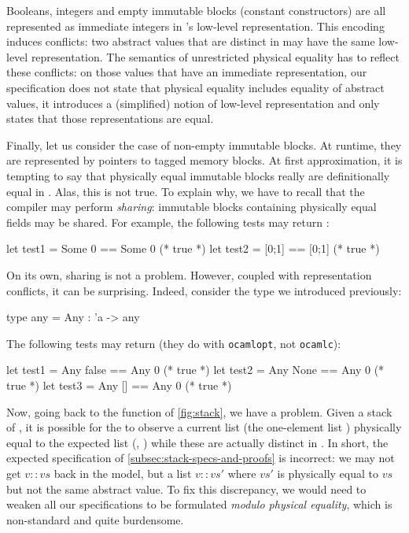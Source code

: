 Booleans, integers and empty immutable blocks (constant constructors) are all represented as immediate integers in \OCaml's low-level representation. This encoding induces conflicts: two abstract values that are distinct in \Rocq may have the same low-level representation.
The semantics of unrestricted physical equality has to reflect these conflicts: on those values that have an immediate representation, our specification does not state that physical equality includes equality of abstract values, it introduces a (simplified) notion of low-level representation and only states that those representations are equal.

Finally, let us consider the case of non-empty immutable blocks.
At runtime, they are represented by pointers to tagged memory blocks.
At first approximation, it is tempting to say that physically equal immutable blocks really are definitionally equal in \Rocq.
Alas, this is not true.
To explain why, we have to recall that the \OCaml compiler may perform \emph{sharing}: immutable blocks containing physically equal fields may be shared.
For example, the following tests may return :

\begin{ocamlcode}
let test1 = Some 0 == Some 0 (* true *)
let test2 = [0;1]  == [0;1]  (* true *)
\end{ocamlcode}

On its own, sharing is not a problem.
However, coupled with representation conflicts, it can be surprising.
Indeed, consider the  type we introduced previously:

\begin{ocamlcode}
type any = Any : 'a -> any
\end{ocamlcode}

The following tests may return  (they do with \texttt{ocamlopt}, not \texttt{ocamlc}):

\begin{ocamlcode}
let test1 = Any false == Any 0 (* true *)
let test2 = Any None  == Any 0 (* true *)
let test3 = Any []    == Any 0 (* true *)
\end{ocamlcode}

Now, going back to the  function of \cref{fig:stack}, we have a problem.
Given a stack of , it is possible for the  to observe a current list (\eg the one-element list \ocamlinline{[Any 0]}) physically equal to the expected list (\eg, ) while these are actually distinct in \Rocq.
In short, the expected specification of \cref{subsec:stack-specs-and-proofs} is incorrect: we may not get $v :: vs$ back in the model, but a list $v :: vs'$ where $vs'$ is physically equal to $vs$ but not the same abstract value.
To fix this discrepancy, we would need to weaken all our specifications to be formulated \emph{modulo physical equality}, which is non-standard and quite burdensome.


